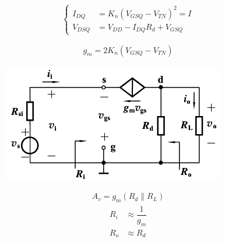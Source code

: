\begin{equation*}
  \left\{
  \begin{aligned}
    I_{DQ} &= K_n \left( V_{GSQ} - V_{TN} \right)^2 = I\\
    V_{DSQ} &= V_{DD} - I_{DQ} R_d + V_{GSQ}
  \end{aligned}
  \right.
\end{equation*}

\begin{equation*}
  \begin{aligned}
    g_m = 2 K_n \left( V_{GSQ} - V_{TN} \right)
  \end{aligned}
\end{equation*}

\begin{figure}[H]
  \centering
  \includegraphics[width=0.5\linewidth]{figures/MOSFET-Common-Gs}
  \label{fig:}
\end{figure}

\begin{equation*}
  \begin{aligned}
    A_v = g_m \left( R_d \parallel R_L \right)
  \end{aligned}
\end{equation*}
\begin{equation*}
  \begin{aligned}
    R_i &\approx \dfrac{1}{g_m} \\
    R_o &\approx R_d
  \end{aligned}
\end{equation*}




